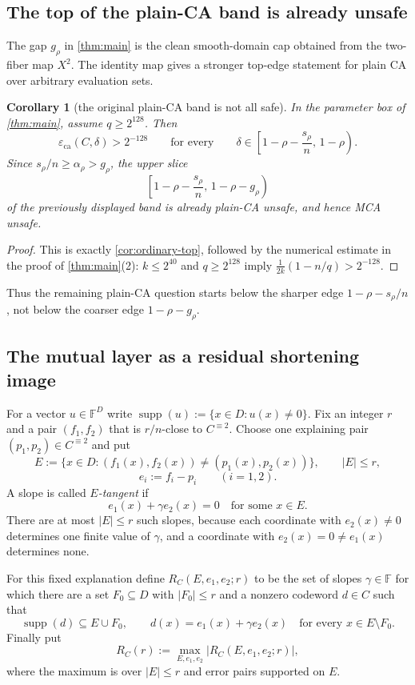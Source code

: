 \documentclass[11pt]{amsart}
\newtheorem{corollary}[corollary]{Corollary}
\theoremstyle{definition}
\theoremstyle{remark}
\newcommand{\F}{\mathbb{F}}
\newcommand{\supp}{\operatorname{supp}}
\newcommand{\eca}{\varepsilon_{\mathrm{ca}}}
\begin{document}
\subsection{The top of the plain-CA band is already unsafe}

The gap $g_\rho$ in \cref{thm:main} is the clean smooth-domain cap obtained from
the two-fiber map $X^2$.  The identity map gives a stronger top-edge statement
for plain CA over arbitrary evaluation sets.

\begin{corollary}[the original plain-CA band is not all safe]\label{cor:old-ca-band-not-safe}
In the parameter box of \cref{thm:main}, assume $q\ge2^{128}$.  Then
\[
        \eca(C,\delta)>2^{-128}
        \qquad\text{for every}\qquad
        \delta\in\left[1-\rho-\frac{s_\rho}{n},\,1-\rho\right).
\]
Since $s_\rho/n\ge\alpha_\rho>g_\rho$, the upper slice
\[
        \left[1-\rho-\frac{s_\rho}{n},\,1-\rho-g_\rho\right)
\]
of the previously displayed band is already plain-CA unsafe, and hence MCA
unsafe.
\end{corollary}

\begin{proof}
This is exactly \cref{cor:ordinary-top}, followed by the numerical estimate in
the proof of \cref{thm:main}(2): $k\le2^{40}$ and $q\ge2^{128}$ imply
$\frac1{2k}(1-n/q)>2^{-128}$.
\end{proof}

Thus the remaining plain-CA question starts below the sharper edge
$1-\rho-s_\rho/n$, not below the coarser edge $1-\rho-g_\rho$.

\subsection{The mutual layer as a residual shortening image}

For a vector $u\in\F^D$ write $\supp(u):=\{x\in D:u(x)\ne0\}$.  Fix an integer
$r$ and a pair $(f_1,f_2)$ that is $r/n$-close to $C^{\equiv2}$.  Choose one
explaining pair $(p_1,p_2)\in C^{\equiv2}$ and put
\[
        E:=\{x\in D:(f_1(x),f_2(x))\ne(p_1(x),p_2(x))\},
        \qquad |E|\le r,
\]
\[
        e_i:=f_i-p_i\qquad(i=1,2).
\]
A slope is called \emph{$E$-tangent} if
\[
        e_1(x)+\gamma e_2(x)=0
        \quad\text{for some }x\in E.
\]
There are at most $|E|\le r$ such slopes, because each coordinate with
$e_2(x)\ne0$ determines one finite value of $\gamma$, and a coordinate with
$e_2(x)=0\ne e_1(x)$ determines none.

For this fixed explanation define $R_C(E,e_1,e_2;r)$ to be the set of slopes
$\gamma\in\F$ for which there are a set $F_0\subseteq D$ with $|F_0|\le r$ and a
nonzero codeword $d\in C$ such that
\[
        \supp(d)\subseteq E\cup F_0,
        \qquad
        d(x)=e_1(x)+\gamma e_2(x)
        \quad\text{for every }x\in E\setminus F_0.
\]
Finally put
\[
        R_C(r):=\max_{E,e_1,e_2}|R_C(E,e_1,e_2;r)|,
\]
where the maximum is over $|E|\le r$ and error pairs supported on $E$.
\end{document}
